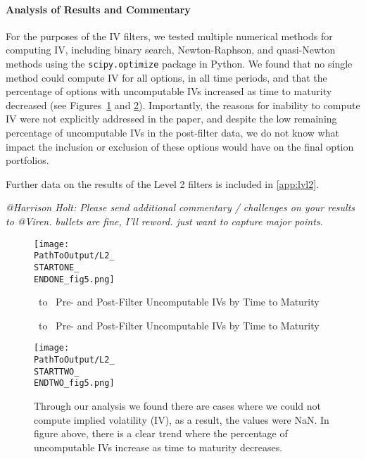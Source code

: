 \paragraph{Analysis of Results and Commentary}
For the purposes of the IV filters, we tested multiple numerical methods for computing IV, including binary search, Newton-Raphson, and quasi-Newton methods using the \texttt{scipy.optimize} package in Python. We found that no single method could compute IV for all options, in all time periods, and that the percentage of options with uncomputable IVs increased as time to maturity decreased (see Figures~\ref{fig:time1lvl2fig5} and \ref{fig:time2lvl2fig5}). Importantly, the reasons for inability to compute IV were not explicitly addressed in the paper, and despite the low remaining percentage of uncomputable IVs in the post-filter data, we do not know what impact the inclusion or exclusion of these options would have on the final option portfolios. 

Further data on the results of the Level 2 filters is included in \autoref{app:lvl2}.

\color{red}\textit{@{Harrison Holt}: Please send additional commentary / challenges on your results to @Viren. bullets are fine, I'll reword. just want to capture major points.}
\color{black}

\begin{figure}[ht] %
  \centering
  \caption{\STARTONE\ to \ENDONE\ Pre- and Post-Filter Uncomputable IVs by Time to Maturity}
  \texttt{[image: \\PathToOutput/L2\_\\STARTONE\_\\ENDONE\_fig5.png]}

  \label{fig:time1lvl2fig5}
\end{figure}

\begin{figure}[ht] %
  \centering
  \caption{\STARTTWO\ to \ENDTWO\ Pre- and Post-Filter Uncomputable IVs by Time to Maturity}
  \texttt{[image: \\PathToOutput/L2\_\\STARTTWO\_\\ENDTWO\_fig5.png]}%
  \caption*{Through our analysis we found there are cases where we could not compute implied volatility (IV), as a result, the values were NaN. In figure above, there is a clear trend where the percentage of uncomputable IVs increase as time to maturity decreases.}
 \label{fig:time2lvl2fig5}
\end{figure}


